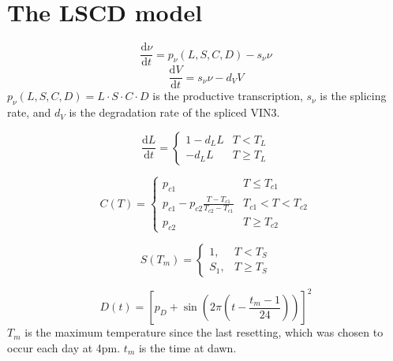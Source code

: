 \documentclass[11pt, a4paper]{article}
\begin{document}
\section*{The LSCD model}

\begin{equation}
    \frac{\mathrm d\nu}{\mathrm d t} = p_{\nu}(L, S, C, D) - s_{\nu}\nu
\end{equation}
\begin{equation}
    \frac{\mathrm dV}{\mathrm dt} = s_{\nu}\nu - d_VV
\end{equation}
$p_{\nu}(L, S, C, D)=L\cdot S\cdot C\cdot D$ is the productive transcription,
$s_{\nu}$ is the splicing rate, and $d_V$ is the degradation rate of the spliced VIN3.

\begin{equation}
    \frac{\mathrm dL}{\mathrm dt} =
    \begin{cases}
    1-d_LL & T < T_L \\
    -d_LL & T \geq T_L
    \end{cases}
\end{equation}

\begin{equation}
    C(T) =
    \begin{cases}
    p_{c1} & T \leq T_{c1} \\
    p_{c1}-p_{c2}\frac{T-T_{c1}}{T_{c2}-T_{c1}} & T_{c1} < T < T_{c2} \\
    p_{c2} & T \geq T_{c2}
    \end{cases}
\end{equation}

\begin{equation}
    S(T_m) = 
    \begin{cases}
    1, & T < T_S \\
    S_1, & T \geq T_S
    \end{cases}
\end{equation}

\begin{equation}
    D(t) =  \left[p_D + \sin\left(2\pi\left(t - \frac{t_m-1}{24}\right)\right)\right]^2
\end{equation}
$T_m$ is the maximum temperature since the last resetting, which was chosen to occur each day at 4pm.
$t_m$ is the time at dawn.
\end{document}
